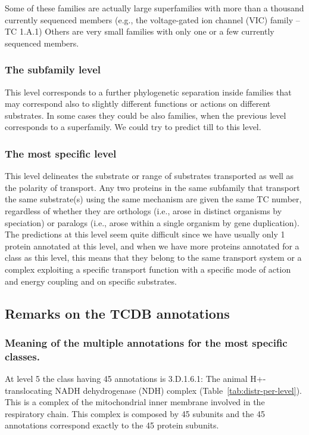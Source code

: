 \documentclass[english]{article}
\begin{document}
Some of these families are actually large superfamilies with more than a thousand currently sequenced members (e.g., the voltage-gated ion channel (VIC) family -- TC 1.A.1) Others are very
small families with only one or a few currently sequenced members.

\subsubsection{The subfamily level}
This level corresponds to a further phylogenetic separation inside families that may correspond also to slightly different functions or actions on different substrates. In some cases they could be also families, when the previous level corresponds to a superfamily. We could try to predict till to this level.

\subsubsection{The most specific level}
This level delineates the substrate or range of substrates transported as well as the polarity of transport. 
Any two proteins  in the same subfamily that transport the same substrate(s) using the same
mechanism are given the same TC number, regardless of whether they are orthologs (i.e., arose in distinct organisms by
speciation) or paralogs (i.e., arose within a single organism by gene duplication).
The predictions at this level seem quite difficult since we have usually only 1 protein annotated at this level, and when we have more proteins annotated for a class as this level, this means that they belong to the same transport system or a complex exploiting a specific transport function with a specific mode of action and energy coupling and on specific substrates.


\subsection{Remarks on the TCDB annotations}

\subsubsection{Meaning of the multiple annotations for the most specific classes.}
At level 5 the class having 45 annotations is  3.D.1.6.1: The animal H+-translocating NADH dehydrogenase (NDH) complex (Table~\ref{tab:distr-per-level}).
This is  a complex of the mitochondrial inner  membrane involved in the respiratory chain. This complex is composed by 45 subunits and the 45 annotations correspond exactly to the 45 protein subunits.
\end{document}
